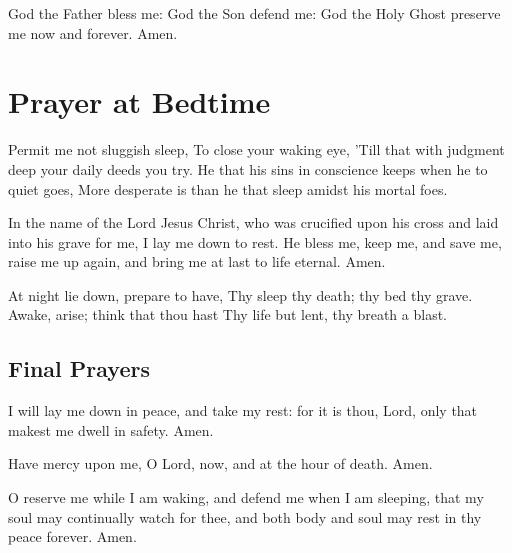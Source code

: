 \documentclass{article}
\begin{document}

God the Father bless me: God the Son defend me: God the Holy Ghost
preserve me now and forever. Amen.

\newpage
\section{Prayer at Bedtime}


\begin{prayer}

  Permit me not sluggish sleep,
    To close your waking eye,
  'Till that with judgment deep
    your daily deeds you try.
  He that his sins in conscience keeps
    when he to quiet goes,
  More desperate is than he that sleep
    amidst his mortal foes.

\end{prayer}


In the name of the Lord Jesus Christ, who was crucified upon his cross
and laid into his grave for me, I lay me down to rest. He bless me,
keep me, and save me, raise me up again, and bring me at last to life
eternal. Amen.


\begin{prayer}

  At night lie down,
    prepare to have,
  Thy sleep thy death;
    thy bed thy grave.
  Awake, arise;
    think that thou hast
  Thy life but lent,
    thy breath a blast.

\end{prayer}

\subsection*{Final Prayers}


I will lay me down in peace, and take my rest: for it is thou, Lord, only that makest me dwell in safety. Amen.


Have mercy upon me, O Lord, now, and at the hour of death. Amen.


O reserve me while I am waking, and defend me when I am sleeping, that my soul
may continually watch for thee, and both body and soul may rest in thy peace forever.
Amen.
\end{document}
